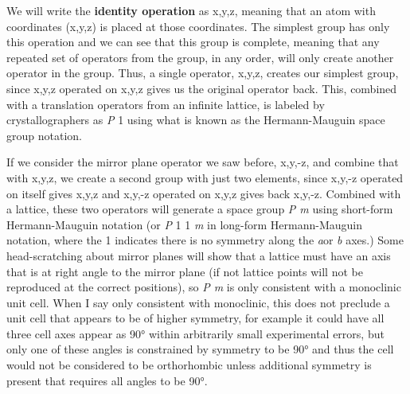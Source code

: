  We will write the \textbf{identity operation} as x,y,z, meaning that an atom with coordinates (x,y,z) is placed at those coordinates. The simplest group has only this operation and we can see that this group is complete, meaning that any repeated set of operators from the group, in any order, will only create another operator in the group. Thus, a single operator, x,y,z, creates our simplest group, since x,y,z operated on x,y,z gives us the original operator back. This, combined with a translation operators from an infinite lattice, is labeled by crystallographers as \textit{P} 1 using what is known as the Hermann-Mauguin space group notation. 

 If we consider the mirror plane operator we saw before, x,y,-z, and combine that with x,y,z, we create a second group with just two elements, since x,y,-z operated on itself gives x,y,z and x,y,-z operated on x,y,z gives back x,y,-z. Combined with a lattice, these two operators will generate a space group \textit{P m} using short-form Hermann-Mauguin notation (or \textit{P }1 1 \textit{m} in long-form Hermann-Mauguin notation, where the 1 indicates there is no symmetry along the \textit{a}or \textit{b} axes.) Some head-scratching about mirror planes will show that a lattice must have an axis that is at right angle to the mirror plane (if not lattice points will not be reproduced at the correct positions), so \textit{P m} is only consistent with a monoclinic unit cell. When I say only consistent with monoclinic, this does not preclude a unit cell that appears to be of higher symmetry, for example it could have all three cell axes appear as 90° within arbitrarily small experimental errors, but only one of these angles is constrained by symmetry to be 90° and thus the cell would not be considered to be orthorhombic unless additional symmetry is present that requires all angles to be 90°.

